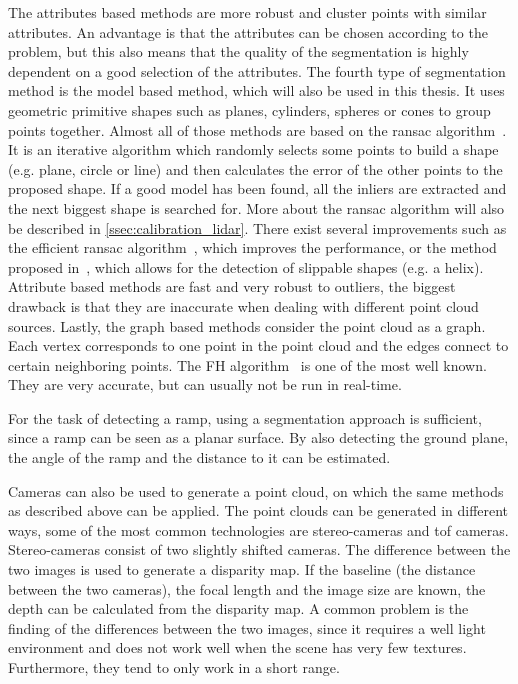 The attributes based methods are more robust and cluster points with similar attributes.
An advantage is that the attributes can be chosen according to the problem, but this also means that the quality of the segmentation is highly dependent on a good selection of the attributes.
The fourth type of segmentation method is the model based method, which will also be used in this thesis.
It uses geometric primitive shapes such as planes, cylinders, spheres or cones to group points together.
Almost all of those methods are based on the \gls{ransac} algorithm~\cite{Fischler1981}.
It is an iterative algorithm which randomly selects some points to build a shape (e.g. plane, circle or line) and then calculates the error of the other points to the proposed shape.
If a good model has been found, all the inliers are extracted and the next biggest shape is searched for.
More about the \gls{ransac} algorithm will also be described in \cref{ssec:calibration_lidar}.
There exist several improvements such as the efficient \gls{ransac} algorithm~\cite{Schnabel2007}, which improves the performance, or the method proposed in~\cite{li2011}, which allows for the detection of slippable shapes (e.g. a helix).
Attribute based methods are fast and very robust to outliers, the biggest drawback is that they are inaccurate when dealing with different point cloud sources.
Lastly, the graph based methods consider the point cloud as a graph.
Each vertex corresponds to one point in the point cloud and the edges connect to certain neighboring points.
The FH algorithm~\cite{Felzenszwalb2004} is one of the most well known.
They are very accurate, but can usually not be run in real-time.

For the task of detecting a ramp, using a segmentation approach is sufficient, since a ramp can be seen as a planar surface.
By also detecting the ground plane, the angle of the ramp and the distance to it can be estimated.

Cameras can also be used to generate a point cloud, on which the same methods as described above can be applied.
The point clouds can be generated in different ways, some of the most common technologies are stereo-cameras and \gls{tof} cameras.
Stereo-cameras consist of two slightly shifted cameras.
The difference between the two images is used to generate a disparity map.
If the baseline (the distance between the two cameras), the focal length and the image size are known, the depth can be calculated from the disparity map.
A common problem is the finding of the differences between the two images, since it requires a well light environment and does not work well when the scene has very few textures.
Furthermore, they tend to only work in a short range.

